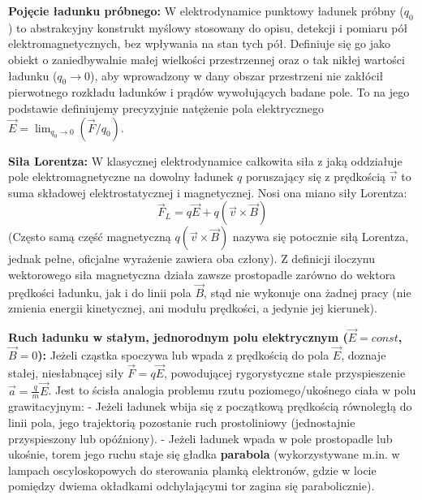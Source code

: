 \documentclass[11pt, a4paper]{article}
\begin{document}
\textbf{Pojęcie ładunku próbnego:}
W elektrodynamice punktowy ładunek próbny ($q_0$) to abstrakcyjny konstrukt myślowy stosowany do opisu, detekcji i pomiaru pół elektromagnetycznych, bez wpływania na stan tych pół. Definiuje się go jako obiekt o zaniedbywalnie małej wielkości przestrzennej oraz o tak nikłej wartości ładunku ($q_0 \to 0$), aby wprowadzony w dany obszar przestrzeni nie zakłócił pierwotnego rozkładu ładunków i prądów wywołujących badane pole. To na jego podstawie definiujemy precyzyjnie natężenie pola elektrycznego $\vec{E} = \lim_{q_0 \to 0} (\vec{F} / q_0)$.

\textbf{Siła Lorentza:}
W klasycznej elektrodynamice całkowita siła z jaką oddziałuje pole elektromagnetyczne na dowolny ładunek $q$ poruszający się z prędkością $\vec{v}$ to suma składowej elektrostatycznej i magnetycznej. Nosi ona miano siły Lorentza:
\[
\vec{F}_L = q\vec{E} + q(\vec{v} \times \vec{B})
\]
(Często samą część magnetyczną $q(\vec{v} \times \vec{B})$ nazywa się potocznie siłą Lorentza, jednak pełne, oficjalne wyrażenie zawiera oba człony). Z definicji iloczynu wektorowego siła magnetyczna działa zawsze prostopadle zarówno do wektora prędkości ładunku, jak i do linii pola $\vec{B}$, stąd nie wykonuje ona żadnej pracy (nie zmienia energii kinetycznej, ani modułu prędkości, a jedynie jej kierunek).

\textbf{Ruch ładunku w stałym, jednorodnym polu elektrycznym ($\vec{E} = const$, $\vec{B} = 0$):}
Jeżeli cząstka spoczywa lub wpada z prędkością do pola $\vec{E}$, doznaje stałej, niesłabnącej siły $\vec{F} = q\vec{E}$, powodującej rygorystyczne stałe przyspieszenie $\vec{a} = \frac{q}{m}\vec{E}$. Jest to ścisła analogia problemu rzutu poziomego/ukośnego ciała w polu grawitacyjnym:
- Jeżeli ładunek wbija się z początkową prędkością równoległą do linii pola, jego trajektorią pozostanie ruch prostoliniowy (jednostajnie przyspieszony lub opóźniony).
- Jeżeli ładunek wpada w pole prostopadle lub ukośnie, torem jego ruchu staje się gładka \textbf{parabola} (wykorzystywane m.in. w lampach oscyloskopowych do sterowania plamką elektronów, gdzie w locie pomiędzy dwiema okładkami odchylającymi tor zagina się parabolicznie).
\end{document}
